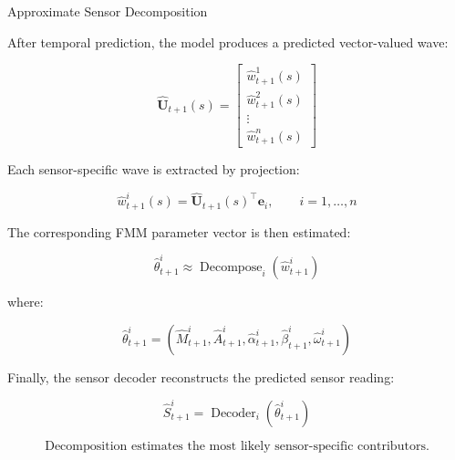 \section{}
    \begin{frame}[allowframebreaks]{Approximate Sensor Decomposition}
        
        
        \small
        
        After temporal prediction, the model produces a predicted vector-valued wave:
        
        \begin{equation}
            \hat{\mathbf{U}}_{t+1}(s)
            =
            \begin{bmatrix}
                \hat{w}_{t+1}^1(s) \\
                \hat{w}_{t+1}^2(s) \\
                \vdots \\
                \hat{w}_{t+1}^n(s)
            \end{bmatrix}
        \end{equation}
        
        Each sensor-specific wave is extracted by projection:
        
        \begin{equation}
            \hat{w}_{t+1}^i(s)
            =
            \hat{\mathbf{U}}_{t+1}(s)^{\top}
            \mathbf{e}_i,
            \qquad
            i=1,\ldots,n
        \end{equation}
        
        The corresponding FMM parameter vector is then estimated:
        
        \begin{equation}
            \hat{\theta}_{t+1}^i
            \approx
            \operatorname{Decompose}_i
            (
            \hat{w}_{t+1}^i
            )
        \end{equation}
        
        where:
        
        \begin{equation}
            \hat{\theta}_{t+1}^i
            =
            (
            \hat{M}_{t+1}^i,
            \hat{A}_{t+1}^i,
            \hat{\alpha}_{t+1}^i,
            \hat{\beta}_{t+1}^i,
            \hat{\omega}_{t+1}^i
            )
        \end{equation}
        
        Finally, the sensor decoder reconstructs the predicted sensor reading:
        
        \begin{equation}
            \hat{S}_{t+1}^i
            =
            \operatorname{Decoder}_i
            (
            \hat{\theta}_{t+1}^i
            )
        \end{equation}
        
        \[
            \text{Decomposition estimates the most likely sensor-specific contributors.}
        \]
    
    \end{frame}